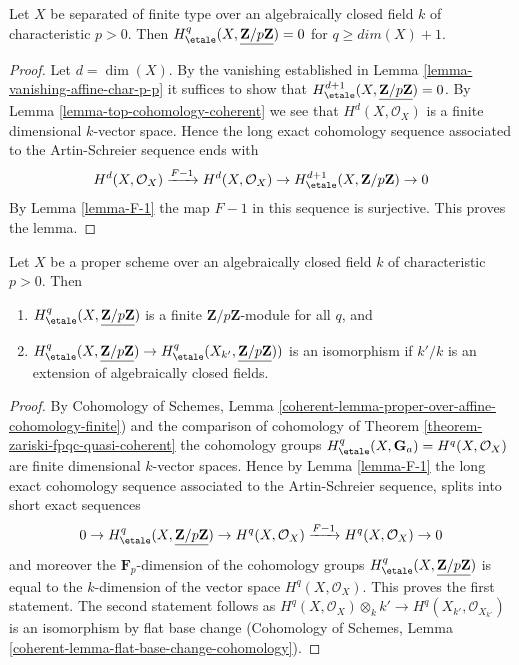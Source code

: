 \begin{lemma}
\label{lemma-vanishing-variety-char-p-p}
Let $X$ be separated of finite type over an algebraically closed
field $k$ of characteristic $p > 0$. Then
$H_\etale^q(X, \underline{\mathbf{Z}/p\mathbf{Z}}) = 0$ for
$q \geq dim(X) + 1$.
\end{lemma}

\begin{proof}
Let $d = \dim(X)$. By the vanishing established in
Lemma \ref{lemma-vanishing-affine-char-p-p}
it suffices to show that
$H_\etale^{d + 1}(X, \underline{\mathbf{Z}/p\mathbf{Z}}) = 0$.
By Lemma \ref{lemma-top-cohomology-coherent} we see that
$H^d(X, \mathcal{O}_X)$ is a finite dimensional $k$-vector space.
Hence the long exact cohomology sequence associated to the
Artin-Schreier sequence ends with
$$
H^d(X, \mathcal{O}_X) \xrightarrow{F - 1}
H^d(X, \mathcal{O}_X) \to H^{d + 1}_\etale(X, \mathbf{Z}/p\mathbf{Z}) \to 0
$$
By Lemma \ref{lemma-F-1} the map $F - 1$ in this sequence is surjective.
This proves the lemma.
\end{proof}

\begin{lemma}
\label{lemma-finiteness-proper-variety-char-p-p}
Let $X$ be a proper scheme over an algebraically closed
field $k$ of characteristic $p > 0$. Then
\begin{enumerate}
\item $H_\etale^q(X, \underline{\mathbf{Z}/p\mathbf{Z}})$
is a finite $\mathbf{Z}/p\mathbf{Z}$-module for all $q$, and
\item $H^q_\etale(X, \underline{\mathbf{Z}/p\mathbf{Z}}) \to
H^q_\etale(X_{k'}, \underline{\mathbf{Z}/p\mathbf{Z}}))$
is an isomorphism if $k'/k$ is an extension of algebraically
closed fields.
\end{enumerate}
\end{lemma}

\begin{proof}
By Cohomology of Schemes, Lemma
\ref{coherent-lemma-proper-over-affine-cohomology-finite})
and the comparison of cohomology of
Theorem \ref{theorem-zariski-fpqc-quasi-coherent} the cohomology groups
$H^q_\etale(X, \mathbf{G}_a) = H^q(X, \mathcal{O}_X)$ are
finite dimensional $k$-vector spaces. Hence by
Lemma \ref{lemma-F-1} the long exact cohomology sequence
associated to the Artin-Schreier sequence, splits into
short exact sequences
$$
0 \to H_\etale^q(X, \underline{\mathbf{Z}/p\mathbf{Z}}) \to
H^q(X, \mathcal{O}_X) \xrightarrow{F - 1} H^q(X, \mathcal{O}_X) \to 0
$$
and moreover the $\mathbf{F}_p$-dimension of the cohomology groups
$H_\etale^q(X, \underline{\mathbf{Z}/p\mathbf{Z}})$ is equal to the
$k$-dimension of the vector space $H^q(X, \mathcal{O}_X)$.
This proves the first statement. The second statement follows
as $H^q(X, \mathcal{O}_X) \otimes_k k' \to H^q(X_{k'}, \mathcal{O}_{X_{k'}})$
is an isomorphism by flat base change
(Cohomology of Schemes,
Lemma \ref{coherent-lemma-flat-base-change-cohomology}).
\end{proof}








